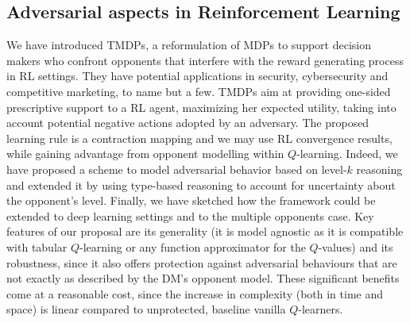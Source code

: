 \subsection{Adversarial aspects in Reinforcement Learning}\label{sec:final}
We have introduced TMDPs, a reformulation of MDPs to 
 support decision makers who confront opponents that interfere 
with the reward generating process in RL settings.
They have potential applications in security, cybersecurity and 
competitive marketing, to name but a few.
TMDPs aim at providing one-sided prescriptive support to a RL agent, maximizing her expected utility, taking into account potential negative actions adopted by an adversary. %
  The proposed learning rule is a contraction mapping and we may use RL convergence results, while gaining advantage from 
  opponent modelling within $Q$-learning. Indeed, we have proposed a scheme to model adversarial behavior based on level-$k$ reasoning
and extended it by using type-based reasoning to account for uncertainty about the opponent's level. Finally, we have sketched how the framework could be extended to deep learning settings and to the multiple opponents case. Key features of our proposal are its generality
(it is model agnostic as it is compatible with tabular $Q$-learning or any function approximator for the $Q$-values) and its robustness, since it also offers 
protection against adversarial behaviours that are not exactly as described by the DM's opponent model. These significant benefits come at a reasonable cost, since the increase in complexity (both in time and space) is linear compared to unprotected, baseline vanilla $Q$-learners.

